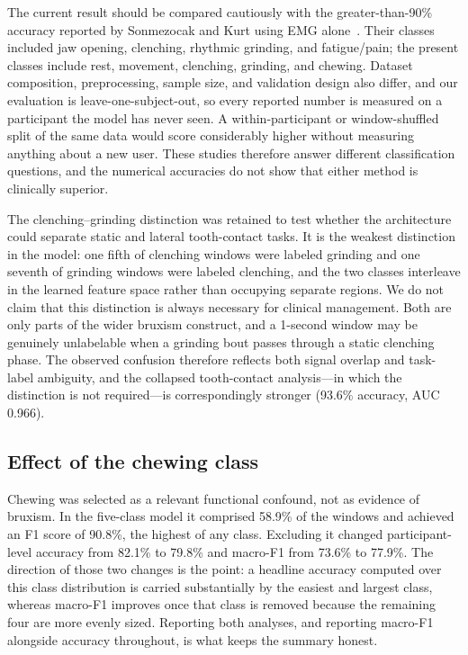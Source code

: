 \documentclass[pdflatex,sn-nature,iicol]{sn-jnl}
\begin{document}
The current result should be compared cautiously with the greater-than-90\% accuracy reported by Sonmezocak and Kurt using EMG alone~\cite{sonmezocak2021detection}. Their classes included jaw opening, clenching, rhythmic grinding, and fatigue/pain; the present classes include rest, movement, clenching, grinding, and chewing. Dataset composition, preprocessing, sample size, and validation design also differ, and our evaluation is leave-one-subject-out, so every reported number is measured on a participant the model has never seen. A within-participant or window-shuffled split of the same data would score considerably higher without measuring anything about a new user. These studies therefore answer different classification questions, and the numerical accuracies do not show that either method is clinically superior.

The clenching--grinding distinction was retained to test whether the architecture could separate static and lateral tooth-contact tasks. It is the weakest distinction in the model: one fifth of clenching windows were labeled grinding and one seventh of grinding windows were labeled clenching, and the two classes interleave in the learned feature space rather than occupying separate regions. We do not claim that this distinction is always necessary for clinical management. Both are only parts of the wider bruxism construct, and a 1-second window may be genuinely unlabelable when a grinding bout passes through a static clenching phase. The observed confusion therefore reflects both signal overlap and task-label ambiguity, and the collapsed tooth-contact analysis---in which the distinction is not required---is correspondingly stronger (93.6\% accuracy, AUC 0.966).

\subsection{Effect of the chewing class}

Chewing was selected as a relevant functional confound, not as evidence of bruxism. In the five-class model it comprised 58.9\% of the windows and achieved an F1 score of 90.8\%, the highest of any class. Excluding it changed participant-level accuracy from 82.1\% to 79.8\% and macro-F1 from 73.6\% to 77.9\%. The direction of those two changes is the point: a headline accuracy computed over this class distribution is carried substantially by the easiest and largest class, whereas macro-F1 improves once that class is removed because the remaining four are more evenly sized. Reporting both analyses, and reporting macro-F1 alongside accuracy throughout, is what keeps the summary honest.
\end{document}
